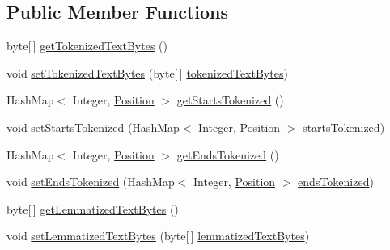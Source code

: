 \subsection*{Public Member Functions}
\begin{DoxyCompactItemize}
\item 
byte\mbox{[}$\,$\mbox{]} \hyperlink{classbr_1_1usp_1_1cata_1_1util_1_1_text_analyzer_language_aec5618fbe65166a3e2c86791581684a7}{get\+Tokenized\+Text\+Bytes} ()
\item 
void \hyperlink{classbr_1_1usp_1_1cata_1_1util_1_1_text_analyzer_language_a458d4efe4b9c8df9f93ca87a5fb87580}{set\+Tokenized\+Text\+Bytes} (byte\mbox{[}$\,$\mbox{]} \hyperlink{classbr_1_1usp_1_1cata_1_1util_1_1_text_analyzer_language_a945cbd60b872e79913ef762b25071eb8}{tokenized\+Text\+Bytes})
\item 
Hash\+Map$<$ Integer, \hyperlink{classbr_1_1usp_1_1cata_1_1model_1_1_position}{Position} $>$ \hyperlink{classbr_1_1usp_1_1cata_1_1util_1_1_text_analyzer_language_a082737cf0c4270fcc75d8ab747d6ba50}{get\+Starts\+Tokenized} ()
\item 
void \hyperlink{classbr_1_1usp_1_1cata_1_1util_1_1_text_analyzer_language_a3f937d328f4f2aad106f27bd535ac391}{set\+Starts\+Tokenized} (Hash\+Map$<$ Integer, \hyperlink{classbr_1_1usp_1_1cata_1_1model_1_1_position}{Position} $>$ \hyperlink{classbr_1_1usp_1_1cata_1_1util_1_1_text_analyzer_language_ac18cfd71df27ee79aa0ed4af4f76d1ae}{starts\+Tokenized})
\item 
Hash\+Map$<$ Integer, \hyperlink{classbr_1_1usp_1_1cata_1_1model_1_1_position}{Position} $>$ \hyperlink{classbr_1_1usp_1_1cata_1_1util_1_1_text_analyzer_language_a73c00708c592a1dee89a190ac4c326ce}{get\+Ends\+Tokenized} ()
\item 
void \hyperlink{classbr_1_1usp_1_1cata_1_1util_1_1_text_analyzer_language_a35961e7adca0ec2a3772fca18842c7db}{set\+Ends\+Tokenized} (Hash\+Map$<$ Integer, \hyperlink{classbr_1_1usp_1_1cata_1_1model_1_1_position}{Position} $>$ \hyperlink{classbr_1_1usp_1_1cata_1_1util_1_1_text_analyzer_language_af558d57afcb314086fa8f6a6ec766ff2}{ends\+Tokenized})
\item 
byte\mbox{[}$\,$\mbox{]} \hyperlink{classbr_1_1usp_1_1cata_1_1util_1_1_text_analyzer_language_adb9fdde44335c9108fa97e0399a291e3}{get\+Lemmatized\+Text\+Bytes} ()
\item 
void \hyperlink{classbr_1_1usp_1_1cata_1_1util_1_1_text_analyzer_language_ac01dbd05b33274322e32dda581c25907}{set\+Lemmatized\+Text\+Bytes} (byte\mbox{[}$\,$\mbox{]} \hyperlink{classbr_1_1usp_1_1cata_1_1util_1_1_text_analyzer_language_a0dbe36375f70b73f9f6e2cb553a57e20}{lemmatized\+Text\+Bytes})

\end{DoxyCompactItemize}
